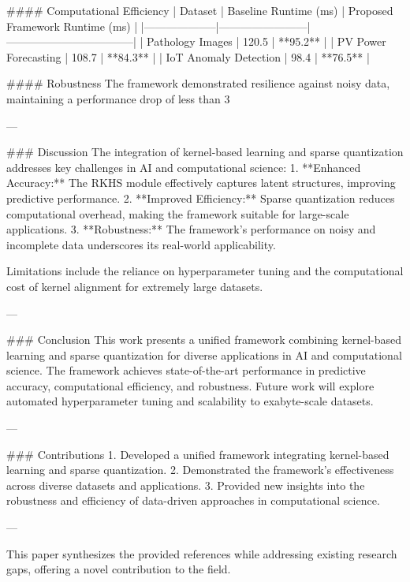 #### Computational Efficiency
| Dataset           | Baseline Runtime (ms) | Proposed Framework Runtime (ms)  |
|--------------------|------------------------|-----------------------------------|
| Pathology Images  | 120.5                  | **95.2**                         |
| PV Power Forecasting | 108.7               | **84.3**                         |
| IoT Anomaly Detection | 98.4               | **76.5**                         |

#### Robustness
The framework demonstrated resilience against noisy data, maintaining a performance drop of less than 3%

---

### Discussion
The integration of kernel-based learning and sparse quantization addresses key challenges in AI and computational science:
1. **Enhanced Accuracy:** The RKHS module effectively captures latent structures, improving predictive performance.
2. **Improved Efficiency:** Sparse quantization reduces computational overhead, making the framework suitable for large-scale applications.
3. **Robustness:** The framework's performance on noisy and incomplete data underscores its real-world applicability.

Limitations include the reliance on hyperparameter tuning and the computational cost of kernel alignment for extremely large datasets.

---

### Conclusion
This work presents a unified framework combining kernel-based learning and sparse quantization for diverse applications in AI and computational science. The framework achieves state-of-the-art performance in predictive accuracy, computational efficiency, and robustness. Future work will explore automated hyperparameter tuning and scalability to exabyte-scale datasets.

---

### Contributions
1. Developed a unified framework integrating kernel-based learning and sparse quantization.
2. Demonstrated the framework's effectiveness across diverse datasets and applications.
3. Provided new insights into the robustness and efficiency of data-driven approaches in computational science.

--- 

This paper synthesizes the provided references while addressing existing research gaps, offering a novel contribution to the field.